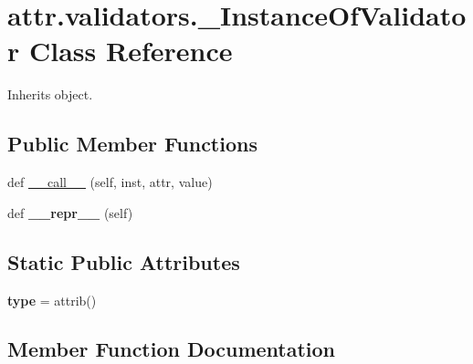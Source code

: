 \hypertarget{classattr_1_1validators_1_1___instance_of_validator}{}\section{attr.\+validators.\+\_\+\+Instance\+Of\+Validator Class Reference}
\label{classattr_1_1validators_1_1___instance_of_validator}


Inherits object.

\subsection*{Public Member Functions}
\begin{DoxyCompactItemize}
\item 
def \hyperlink{classattr_1_1validators_1_1___instance_of_validator_a56bec69c072d13d49e12e7747c8998ce}{\+\_\+\+\_\+call\+\_\+\+\_\+} (self, inst, attr, value)
\item 
\mbox{\label{classattr_1_1validators_1_1___instance_of_validator_a3eb69dfded9c46fbc257d81b7ea90093}} 
def {\bfseries \+\_\+\+\_\+repr\+\_\+\+\_\+} (self)
\end{DoxyCompactItemize}
\subsection*{Static Public Attributes}
\begin{DoxyCompactItemize}
\item 
\mbox{\label{classattr_1_1validators_1_1___instance_of_validator_a398195d0b98136cc4d3af9b959a027c6}} 
{\bfseries type} = attrib()
\end{DoxyCompactItemize}


\subsection{Member Function Documentation}
\mbox{\label{classattr_1_1validators_1_1___instance_of_validator_a56bec69c072d13d49e12e7747c8998ce}} 
